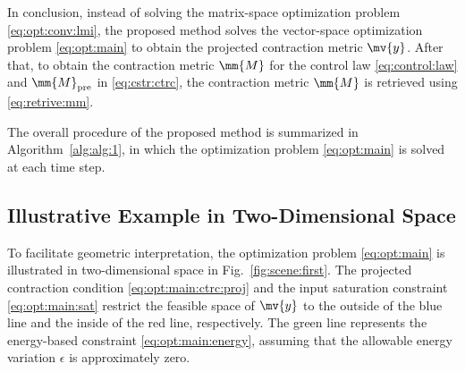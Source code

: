 \documentclass[lettersize,journal]{IEEEtran}
\begin{document}
In conclusion, instead of solving the matrix-space optimization problem \eqref{eq:opt:conv:lmi}, the proposed method solves the vector-space optimization problem \eqref{eq:opt:main} to obtain the projected contraction metric $\mv{y}$.
After that, to obtain the contraction metric $\mm{M}$ for the control law \eqref{eq:control:law} and $\mm{M}_{\rm{pre}}$ in \eqref{eq:cstr:ctrc}, the contraction metric $\mm{M}$ is retrieved using \eqref{eq:retrive:mm}.
   
The overall procedure of the proposed method is summarized in Algorithm~\ref{alg:alg:1}, in which the optimization problem \eqref{eq:opt:main} is solved at each time step.


\subsection{Illustrative Example in Two-Dimensional Space} \label{sec:sub:illustrative}


To facilitate geometric interpretation, the optimization problem \eqref{eq:opt:main} is illustrated in two-dimensional space in Fig.~\ref{fig:scene:first}.
The projected contraction condition \eqref{eq:opt:main:ctrc:proj} and the input saturation constraint \eqref{eq:opt:main:sat} restrict the feasible space of $\mv{y}$ to the outside of the blue line and the inside of the red line, respectively.
The green line represents the energy-based constraint \eqref{eq:opt:main:energy}, assuming that the allowable energy variation $\epsilon$ is approximately zero.
\end{document}
